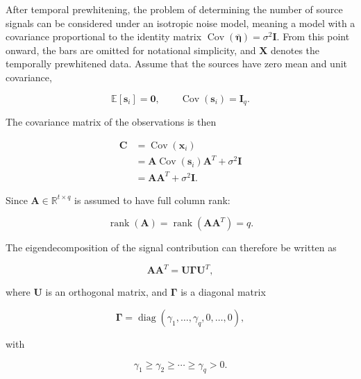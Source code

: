 \documentclass[english]{pwr_wmat_praca_dyplomowa}
\theoremstyle{definition}
\theoremstyle{remark}
\begin{document}
After temporal prewhitening, the problem of determining the number of source signals can be considered under an isotropic noise model, meaning a model with a covariance proportional to the identity matrix $\operatorname{Cov}(\overline{\boldsymbol{\eta}}) = \sigma^2 \mathbf{I}$. From this point onward, the bars are omitted for notational simplicity, and $\mathbf{X}$ denotes the temporally prewhitened data. Assume that the sources have zero mean and unit covariance,

\begin{equation}
    \mathbb{E}[\mathbf{s}_i] = \mathbf{0}, \qquad \operatorname{Cov}(\mathbf{s}_i) = \mathbf{I}_q.
\end{equation}

The covariance matrix of the observations is then

\begin{align}
    \mathbf{C}
    &= \operatorname{Cov}(\mathbf{x}_i) \\
    &= \mathbf{A} \operatorname{Cov}(\mathbf{s}_i) \mathbf{A}^T + \sigma^2\mathbf{I} \\
    &= \mathbf{A}\mathbf{A}^T + \sigma^2\mathbf{I}.
    \label{eq:pica-observation-covariance}
\end{align}

Since $\mathbf{A}\in\mathbb{R}^{t\times q}$ is assumed to have full column rank:

\begin{equation}
    \operatorname{rank}(\mathbf{A}) = \operatorname{rank} \left( \mathbf{A}\mathbf{A}^T \right) = q.
\end{equation}

The eigendecomposition of the signal contribution can therefore be written as

\begin{equation}
    \mathbf{A}\mathbf{A}^T = \mathbf{U} \boldsymbol{\Gamma} \mathbf{U}^T,
\end{equation}

where $\mathbf{U}$ is an orthogonal matrix, and $\boldsymbol{\Gamma}$ is a diagonal matrix

\begin{equation}
    \boldsymbol{\Gamma} = \operatorname{diag} \left(\gamma_1,\ldots,\gamma_q, 0,\ldots,0\right),
\end{equation}

with

\begin{equation}
    \gamma_1 \geq \gamma_2 \geq \cdots \geq \gamma_q > 0.
\end{equation}
\end{document}
